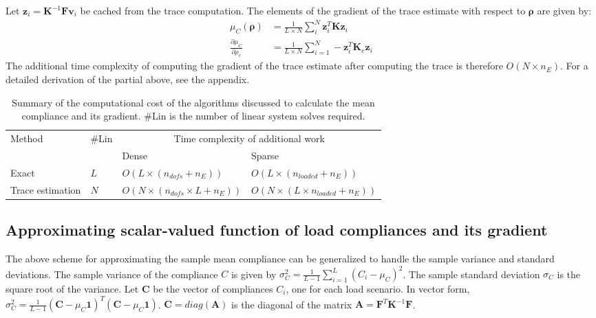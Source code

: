       Let $\bm{z}_i = \bm{K}^{-1} \bm{F} \bm{v}_i$ be cached from the trace computation. The elements of the gradient of the trace estimate with respect to $\bm{\rho}$ are given by:
      \begin{align}
       \mu_C(\bm{\rho}) & = \frac{1}{L \times N} \sum_i^N \bm{z}_i^T \bm{K} \bm{z}_i \\
       \frac{\partial \mu_C}{\partial \rho_e} & = \frac{1}{L \times N} \sum_{i=1}^N -\bm{z}_i^T \bm{K}_e \bm{z}_i
      \end{align}
      The additional time complexity of computing the gradient of the trace estimate after computing the trace is therefore $O(N \times n_E)$. For a detailed derivation of the partial above, see the appendix.

      \begin{table}
       \centering
       \caption{Summary of the computational cost of the algorithms discussed to calculate the mean compliance and its gradient. \#Lin is the number of linear system solves required.}
       \begin{tabular}{| m{3cm} | m{0.7cm} | m{4cm} | m{5cm}|} 
        \hline
        \multirow{2}{3em}{Method} & \multirow{2}{2em}{\#Lin} & \multicolumn{2}{c|}{Time complexity of additional work} \\\cline{3-4}
        & & Dense & Sparse \\
        \hline
        \hline
        Exact & \(L\) & \(O(L \times (n_{dofs} + n_E))\) & \(O(L \times (n_{loaded} + n_E))\) \\
        \hline
        Trace estimation & \(N\) & \(O(N \times (n_{dofs} \times L + n_E))\) & \(O(N \times (L \times n_{loaded} + n_E))\) \\
        \hline
       \end{tabular}
       \label{tab:perf_mean}
      \end{table}

  \subsection{Approximating scalar-valued function of load compliances and its gradient} \label{sec:proposed_risk}

    The above scheme for approximating the sample mean compliance can be generalized to handle the sample variance and standard deviations. The sample variance of the compliance $C$ is given by $\sigma_C^2 = \frac{1}{L-1} \sum_{i=1}^L (C_i - \mu_C)^2$. The sample standard deviation $\sigma_C$ is the square root of the variance. Let $\bm{C}$ be the vector of compliances $C_i$, one for each load scenario. In vector form, $\sigma_C^2 = \frac{1}{L-1} (\bm{C} - \mu_C \bm{1})^T (\bm{C} - \mu_C \bm{1})$. $\bm{C} = diag(\bm{A})$ is the diagonal of the matrix $\bm{A} = \bm{F}^T \bm{K}^{-1} \bm{F}$.

